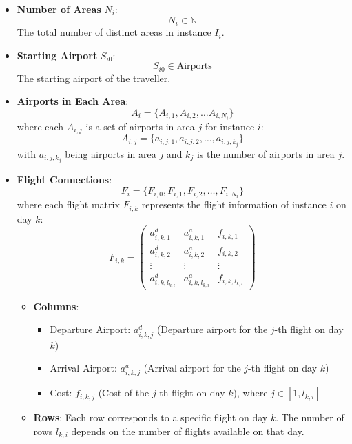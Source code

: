 \begin{itemize}
    \item \textbf{Number of Areas} \(N_i\):
    \[
    N_i \in \mathbb{N}
    \]
    The total number of distinct areas in instance \(I_i\).
    
    \item \textbf{Starting Airport} \(S_{i0}\):
    \[
    S_{i0} \in \text{Airports}
    \]
    The starting airport of the traveller.
    
    \item \textbf{Airports in Each Area}:
    \[A_{i}=
    \{A_{i,1}, A_{i,2}, \ldots A_{i,{N_i}}\}
    \]
    where each \(A_{i,j}\) is a set of airports in area \(j\) for instance \(i\):
    \[
    A_{i,j} = \{ a_{i,j,1}, a_{i,j,2}, \ldots, a_{i,j,k_j} \}
    \]
    with \( a_{i,j,k_j} \) being airports in area \(j\) and \(k_j\) is the number of airports in area \(j\).
    
    \item \textbf{Flight Connections}:
    \[F_{i}=
    \{F_{i,0},F_{i,1}, F_{i,2}, \ldots, F_{i,N_i}\}
    \]
    where each flight matrix \( F_{i,k} \) represents the flight information of instance $i$ on day \(k\):
    \[
    F_{i,k} = \begin{pmatrix}
    a_{i,k,1}^d & a_{i,k,1}^a & f_{i,k,1} \\
    a_{i,k,2}^d & a_{i,k,2}^a & f_{i,k,2} \\
    \vdots & \vdots & \vdots \\
    a_{i,k,l_{k,i}}^d & a_{i,k,l_{k,i}}^a & f_{i,k,l_{k,i}}
    \end{pmatrix}
    \]

    \begin{itemize}
        \item \textbf{Columns}:
        \begin{itemize}
            \item Departure Airport: \( a_{i,k,j}^d \) (Departure airport for the \(j\)-th flight on day \(k\))
            \item Arrival Airport: \( a_{i,k,j}^a \) (Arrival airport for the \(j\)-th flight on day \(k\))
            \item Cost: \( f_{i,k,j} \) (Cost of the \(j\)-th flight on day \(k\)), where \( j \in [1, l_{k,i}] \)
            \end{itemize}
        \item \textbf{Rows}: 
        Each row corresponds to a specific flight on day \(k\). The number of rows \(l_{k,i}\) depends on the number of flights available on that day.
    \end{itemize}

\end{itemize}



